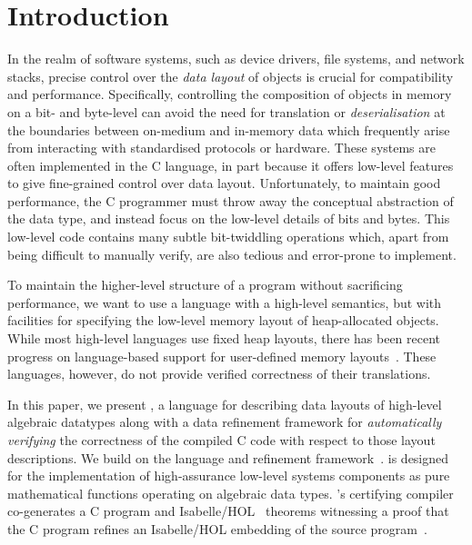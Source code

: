 \section{Introduction}\label{sec:intro}

In the realm of software systems, such as device drivers, file
systems, and network stacks, precise control over the
\emph{data layout} of objects is crucial for compatibility and
performance. Specifically, controlling the composition of objects in memory
on a bit- and byte-level can avoid the need for translation or \emph{deserialisation} 
at the boundaries between on-medium and
in-memory data which frequently arise from interacting with
standardised protocols or hardware.
%
These systems are often implemented in the C language, in part because it offers low-level features to give fine-grained control over data layout. 
Unfortunately, to maintain good performance, the C programmer must throw away the conceptual abstraction of the data type, and instead focus on the low-level details of bits and bytes. This low-level code contains many subtle bit-twiddling
operations which, apart from being difficult to manually verify, are
also tedious and error-prone to implement.

% 



To maintain the higher-level structure of a program without sacrificing
performance, we want to use a language with a high-level semantics, but with facilities for
specifying the low-level memory layout of heap-allocated objects. While most
high-level languages use fixed heap layouts, there has been recent
progress on language-based support for user-defined memory
layouts~\cite{Cronburg:2019,Vollmer:2019}. These languages, however, do
not provide verified correctness of their translations.

In this paper, we present \Dargent, a language for describing data
layouts of high-level algebraic datatypes along with a data
refinement framework for \emph{automatically verifying} the correctness of the compiled C code
with respect to those layout descriptions. We
build on the \cogent language and refinement framework~\citep{Cogent_JFP_2021}.
\cogent is designed for the implementation of high-assurance low-level systems components as pure
mathematical functions operating on algebraic data types.
\cogent's certifying compiler co-generates
a C program and Isabelle/HOL~\citep{Nipkow:2002} theorems witnessing a proof
that the C program refines an Isabelle/HOL embedding of the \cogent source program~\cite{Rizkallah:itp16}. 

